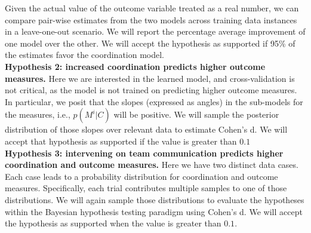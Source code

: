Given the actual value of the outcome variable treated as a real number, we can
compare pair-wise estimates from the two models across training data instances
in a leave-one-out scenario. We will report the percentage average improvement
of one model over the other. We will accept the hypothesis as supported if 95\%
of the estimates favor the coordination model. \\

\noindent \textbf{Hypothesis 2: increased coordination predicts higher outcome measures.}
Here we are interested in the learned model, and cross-validation is not
critical, as the model is not trained on predicting higher outcome measures.  In
particular, we posit that the slopes (expressed as angles) in the sub-models for the measures, i.e.,
$p(M^i|C)$ will be positive. We will sample the posterior distribution of
those slopes over relevant data to estimate Cohen's d. We will accept that
hypothesis as supported if the value is greater than $0.1$ \\

\noindent \textbf{Hypothesis 3: intervening on team communication predicts
higher coordination and outcome measures.} Here we have two distinct data cases.
Each case leads to a probability distribution for coordination and outcome
measures.  Specifically, each trial contributes multiple samples to one of those
distributions. We will again sample those distributions to evaluate the hypotheses
within the Bayesian hypothesis testing paradigm using Cohen's d. We will accept
the hypothesis as supported when the value is greater than $0.1$. 
